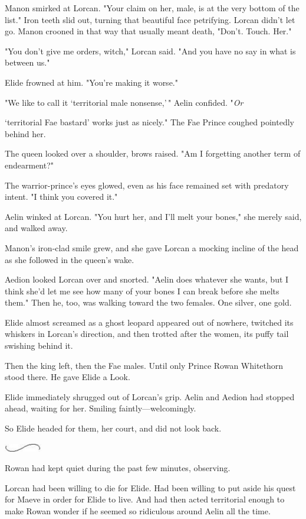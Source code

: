 Manon smirked at Lorcan. "Your claim on her, male, is at the very bottom of the list." Iron teeth slid out, turning that beautiful face petrifying. Lorcan didn't let go. Manon crooned in that way that usually meant death, "Don't. Touch. Her."

"You don't give me orders, witch," Lorcan said. "And you have no say in what is between us."

Elide frowned at him. "You're making it worse."

"We like to call it `territorial male nonsense,'\," Aelin confided. "\emph{Or}

`territorial Fae bastard' works just as nicely." The Fae Prince coughed pointedly behind her.

The queen looked over a shoulder, brows raised. "Am I forgetting another term of endearment?"

The warrior-prince's eyes glowed, even as his face remained set with predatory intent. "I think you covered it."

Aelin winked at Lorcan. "You hurt her, and I'll melt your bones," she merely said, and walked away.

Manon's iron-clad smile grew, and she gave Lorcan a mocking incline of the head as she followed in the queen's wake.

Aedion looked Lorcan over and snorted. "Aelin does whatever she wants, but I think she'd let me see how many of your bones I can break before she melts them." Then he, too, was walking toward the two females. One silver, one gold.

Elide almost screamed as a ghost leopard appeared out of nowhere, twitched its whiskers in Lorcan's direction, and then trotted after the women, its puffy tail swishing behind it.

Then the king left, then the Fae males. Until only Prince Rowan Whitethorn stood there. He gave Elide a Look.

Elide immediately shrugged out of Lorcan's grip. Aelin and Aedion had stopped ahead, waiting for her. Smiling faintly---welcomingly.

So Elide headed for them, her court, and did not look back.

\includegraphics[width=0.65in,height=0.13in]{images/seperator}

Rowan had kept quiet during the past few minutes, observing.

Lorcan had been willing to die for Elide. Had been willing to put aside his quest for Maeve in order for Elide to live. And had then acted territorial enough to make Rowan wonder if he seemed so ridiculous around Aelin all the time.


